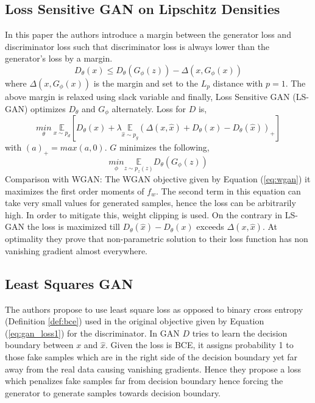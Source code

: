 \subsection*{Loss Sensitive GAN on Lipschitz Densities \citep{ls-gan}}
In this paper the authors introduce a margin between the generator loss and discriminator loss such that discriminator loss is always lower than the generator's loss by a margin. $$D_{\theta}(x) \leq D_{\theta}(G_{\phi}(z)) - \Delta(x, G_{\phi}(x)) $$ where $\Delta(x, G_{\phi}(x))$ is the margin and set to the $L_p$ distance with $p=1$. The above margin is relaxed using slack variable and finally, Loss Sensitive GAN (LS-GAN) optimizes $D_{\theta}$ and $G_{\phi}$ alternately. Loss for $D$ is,
$$ \underset{\theta}{min} \ \underset{x \sim p_d}{\mathbb{E}} [D_{\theta}(x) + \lambda \underset{\hat{x} \sim p_g}{\mathbb{E}} (\Delta (x, \hat{x}) + D_{\theta}(x) - D_{\theta}(\hat{x}))_{+}]
$$
with $(a)_{+} = max(a,0)$. $G$ minimizes the following,
$$\underset{\phi}{min} \underset{z \sim p_z(z)}{\mathbb{E}} D_{\theta}(G_{\phi}(z))$$
Comparison with WGAN: The WGAN objective given by Equation (\ref{eq:wgan}) it maximizes the first order moments of $f_w$. The second term in this equation can take very small values for generated samples, hence the loss can be arbitrarily high. In order to mitigate this, weight clipping is used. On the contrary in LS-GAN the loss is maximized till $D_{\theta}(\hat{x}) - D_{\theta}(x)$ exceeds $\Delta(x, \hat{x})$. At optimality they prove that non-parametric solution to their loss function has non vanishing gradient almost everywhere.\\






\subsection*{Least Squares GAN  \citep{lsgan}} The authors propose to use least square loss as opposed to binary cross entropy (Definition \ref{def:bce}) used in the original objective given by Equation (\ref{eq:gan_loss1}) for the discriminator. In GAN $D$ tries to learn the decision boundary between $x$ and $\hat{x}$. Given the loss is BCE, it assigns probability 1 to those fake samples which are in the right side of the decision boundary yet far away from the real data causing vanishing gradients. Hence they propose a loss which penalizes fake samples far from decision boundary hence forcing the generator to generate samples towards decision boundary. 


